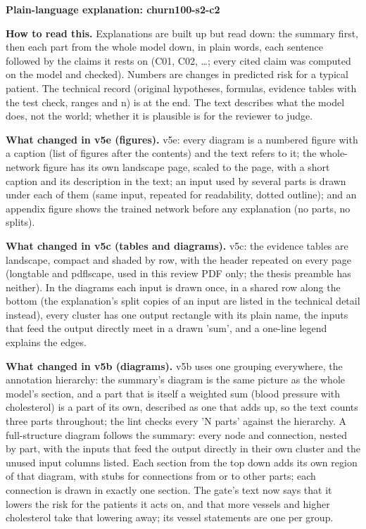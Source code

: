 \documentclass[a4paper,10pt]{article}
\begin{document}
\begin{center}{\Large\bfseries Plain-language explanation: churn100-s2-c2\par}\vspace{2mm}{\small AI-assisted drafts for review. Nothing here has been verified by a person.\par}\end{center}
\noindent\textbf{How to read this.} Explanations are built up but read down: the summary first, then each part from the whole model down, in plain words, each sentence followed by the claims it rests on (C01, C02, \ldots; every cited claim was computed on the model and checked). Numbers are changes in predicted risk for a typical patient. The technical record (original hypotheses, formulas, evidence tables with the test check, ranges and n) is at the end. The text describes what the model does, not the world; whether it is plausible is for the reviewer to judge.
\par\medskip\noindent\textbf{What changed in v5e (figures).} v5e: every diagram is a numbered figure with a caption (list of figures after the contents) and the text refers to it; the whole-network figure has its own landscape page, scaled to the page, with a short caption and its description in the text; an input used by several parts is drawn under each of them (same input, repeated for readability, dotted outline); and an appendix figure shows the trained network before any explanation (no parts, no splits).
\par\medskip\noindent\textbf{What changed in v5c (tables and diagrams).} v5c: the evidence tables are landscape, compact and shaded by row, with the header repeated on every page (longtable and pdflscape, used in this review PDF only; the thesis preamble has neither). In the diagrams each input is drawn once, in a shared row along the bottom (the explanation's split copies of an input are listed in the technical detail instead), every cluster has one output rectangle with its plain name, the inputs that feed the output directly meet in a drawn 'sum', and a one-line legend explains the edges.
\par\medskip\noindent\textbf{What changed in v5b (diagrams).} v5b uses one grouping everywhere, the annotation hierarchy: the summary's diagram is the same picture as the whole model's section, and a part that is itself a weighted sum (blood pressure with cholesterol) is a part of its own, described as one that adds up, so the text counts three parts throughout; the lint checks every 'N parts' against the hierarchy. A full-structure diagram follows the summary: every node and connection, nested by part, with the inputs that feed the output directly in their own cluster and the unused input columns listed. Each section from the top down adds its own region of that diagram, with stubs for connections from or to other parts; each connection is drawn in exactly one section. The gate's text now says that it lowers the risk for the patients it acts on, and that more vessels and higher cholesterol take that lowering away; its vessel statements are one per group.
\end{document}
